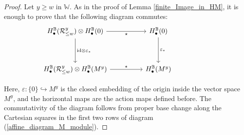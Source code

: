\documentclass[11pt]{article}
\newcommand{\R}{\mathcal{R}}
\newcommand{\bbB}{\mathbb{B}}
\newcommand{\1}{\mathbb{1}}
\newcommand{\tW}{\mathbb{W}}
\newcommand{\HBM}[2]{H_\bullet^{#1}(#2)}
\theoremstyle{definition}
\numberwithin{equation}{section}
\begin{document}
\begin{proof}
    Let $y\geq w$ in $\tW$. As in the proof of Lemma \ref{finite_Image_in_HM}, it is enough to prove that the following diagram commutes:
    \[\begin{tikzcd}
	\HBM{\bbB}{\R^y_{\leq w}} \otimes \HBM{\bbB}{0} && \HBM{\bbB}{0} \\
	\\
	\HBM{\bbB}{\R^y_{\leq w}} \otimes \HBM{\bbB}{M^y} && \HBM{\bbB}{M^y}&& 
	\arrow["\star"', from=1-1, to=1-3]
	\arrow["\text{id} \otimes \varepsilon_*", from=1-1, to=3-1]
	\arrow["\varepsilon_*", from=1-3, to=3-3]
	\arrow["\star",from=3-1, to=3-3]
\end{tikzcd}\]

Here, $\varepsilon : \{ 0 \}\hookrightarrow M^y$ is the closed embedding of the origin inside the vector space $M^y$, and the horizontal maps are the action maps defined before. The commutativity of the diagram follows from proper base change along the Cartesian squares in the first two rows of diagram (\ref{affine_diagram_M_module}).
\end{proof}
\end{document}
